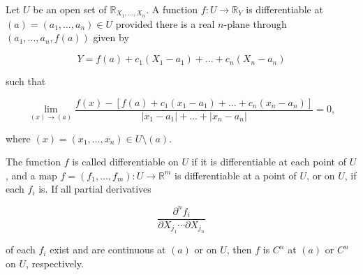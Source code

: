 Let $U$ be an open set of $\mathbb{R}_{X_1, \ldots, X_n}$. A function $f: U \to \mathbb{R}_Y$ is differentiable at $(a) = (a_1, \ldots, a_n) \in U$ provided there is a real $n$-plane through $(a_1, \ldots, a_n, f(a))$ given by

$$Y = f(a) + c_1(X_1 - a_1) + \ldots + c_n(X_n - a_n)$$

such that

$$\lim_{(x) \to (a)} \frac{f(x) - [f(a) + c_1(x_1 - a_1) + \ldots + c_n(x_n - a_n)]}{|x_1 - a_1| + \ldots + |x_n - a_n|} = 0,$$

where $(x) = (x_1, \ldots, x_n) \in U \setminus (a)$.

The function $f$ is called differentiable on $U$ if it is differentiable at each point of $U$, and a map $f = (f_1, \ldots, f_m): U \to \mathbb{R}^m$ is differentiable at a point of $U$, or on $U$, if each $f_i$ is. If all partial derivatives

$$\frac{\partial^n f_i}{\partial X_{j_1} \cdots \partial X_{j_n}}$$

of each $f_i$ exist and are continuous at $(a)$ or on $U$, then $f$ is $C^n$ at $(a)$ or $C^n$ on $U$, respectively.
